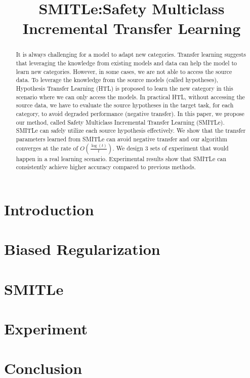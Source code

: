 \documentclass{article}
\title{SMITLe:Safety Multiclass Incremental Transfer Learning}
\begin{document}
\maketitle

\begin{abstract}
It is always challenging for a model to adapt new categories. Transfer learning suggests that leveraging the knowledge from existing models and data can help the model to learn new categories. However, in some cases, we are not able to access the source data. To leverage the knowledge from the source models (called hypotheses), Hypothesis Transfer Learning (HTL) is proposed to learn the new category in this scenario where we can only access the models. In practical HTL, without accessing the source data, we have to evaluate the source hypotheses in the target task, for each category, to avoid degraded performance (negative transfer).
In this paper, we propose our method, called Safety Multiclass Incremental Transfer Learning (SMITLe). SMITLe can safely utilize each source hypothesis effectively. We show that the transfer parameters learned from SMITLe can avoid negative transfer and our algorithm converges at the rate of $O(\frac{\log(t)}{t})$. We design 3 sets of experiment that would happen in a real learning scenario. Experimental results show that SMITLe can consistently achieve higher accuracy compared to previous methods.
\end{abstract}
\section{Introduction}


%

\section{Biased Regularization}\label{sec:prob}


\section{SMITLe}\label{sec:smitle}


\section{Experiment}\label{sec:exp}


\section{Conclusion}


\appendix




\end{document}
